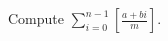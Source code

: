 Compute $\sum_{i=0}^{n-1}[\frac{a+bi}{m}]$.

\inputminted{cpp}{src/mathematics/computation/euclidean-like-algorithm.cpp.com}

